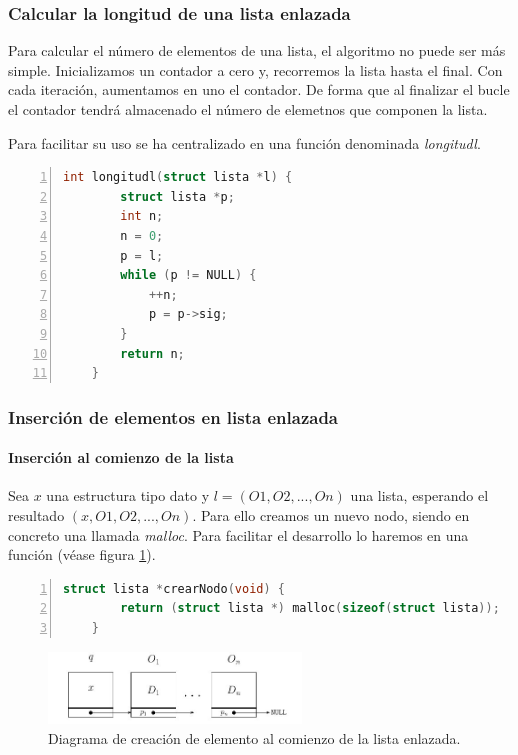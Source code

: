 \documentclass[a4paper, 11pt, titlepage]{article}
\begin{document}
        \subsubsection{Calcular la longitud de una lista enlazada}

            Para calcular el número de elementos de una lista, el algoritmo no puede ser más
            simple. Inicializamos un contador a cero y, recorremos la lista hasta el final.
            Con cada iteración, aumentamos en uno el contador. De forma que al finalizar el bucle
            el contador tendrá almacenado el número de elemetnos que componen la lista.

            Para facilitar su uso se ha centralizado en una función denominada \textit{longitudl}.
            
        \begin{lstlisting}[language=C,numbers=left]
    int longitudl(struct lista *l) {
        struct lista *p;
        int n;
        n = 0;
        p = l;
        while (p != NULL) {
            ++n;
            p = p->sig;
        }
        return n;
    }\end{lstlisting}

        \subsubsection{Inserción de elementos en lista enlazada}\label{listaenlazada_insercion}

            \paragraph{Inserción al comienzo de la lista} Sea $x$ una estructura tipo dato 
            y $l = (O1, O2, ... , On)$ una lista, esperando el resultado $(x, O1, O2, ... , On)$.
            Para ello creamos un nuevo nodo, siendo en concreto una llamada \textit{malloc}. Para 
            facilitar el desarrollo lo haremos en una función (véase figura \ref{listaenlazada05}).

            \begin{lstlisting}[language=C,numbers=left]
    struct lista *crearNodo(void) {
        return (struct lista *) malloc(sizeof(struct lista));
    }\end{lstlisting}

            \begin{figure}[htp]
                \centering
                \includegraphics[width=0.6\textwidth]{resources/listaenlazada05.jpg}
                \caption{Diagrama de creación de elemento al comienzo de la lista enlazada.}
                \label{listaenlazada05}
            \end{figure}
\end{document}
